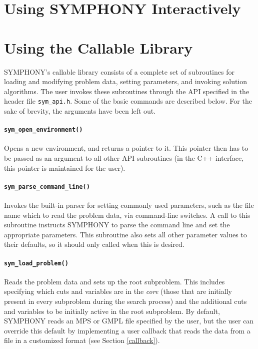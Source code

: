 \section{Using SYMPHONY Interactively}

\section{Using the Callable Library}\label{callable_library}

SYMPHONY's callable library consists of a complete set of subroutines for
loading and modifying problem data, setting parameters, and invoking solution
algorithms. The user invokes these subroutines through the API specified in
the header file \texttt{sym\_api.h}. Some of the basic commands are described
below. For the sake of brevity, the arguments have been left out. 

\paragraph{\texttt{sym\_open\_environment()}} Opens a new environment, and
returns a pointer to it. This pointer then has to be passed as an argument to
all other API subroutines (in the C++ interface, this pointer is maintained
for the user).

\paragraph{\texttt{sym\_parse\_command\_line()}} Invokes the built-in
parser for setting commonly used parameters, such as the file name which to
read the problem data, via command-line switches. A call to this subroutine
instructs SYMPHONY to parse the command line and set the appropriate
parameters. This subroutine also sets all other parameter values to their
defaults, so it should only called when this is desired.

\paragraph{\texttt{sym\_load\_problem()}} Reads the problem data and sets up
the root subproblem. This includes specifying which cuts and variables are in
the \emph{core} (those that are initially present in every subproblem during
the search process) and the additional cuts and variables to be initially
active in the root subproblem. By default, SYMPHONY reads an MPS or GMPL
file specified by the user, but the user can override this default by
implementing a user callback that reads the data from a file in a customized
format (see Section \ref{callback}).


